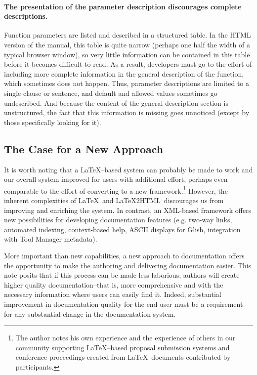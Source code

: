 \paragraph{The presentation of the parameter description discourages
complete descriptions.}  Function parameters are listed and described in a
structured table.  In the HTML version of the manual, this table is
quite narrow (perhaps one half the width of a typical browser
window), so very little information can be contained in this table
before it becomes difficult to read.  As a result, developers must go
to the effort of including more complete information in the general
description of the function, which sometimes does not happen.
Thus, parameter descriptions are limited to a single clause or
sentence, and default and allowed values sometimes go undescribed.
And because the content of the general description section is
unstructured, the fact that this information is missing goes unnoticed
(except by those specifically looking for it).  

\subsection{The Case for a New Approach} 

It is worth noting that a \LaTeX--based system can probably be made to
work and our overall system improved for users with additional effort,
perhaps even comparable to the effort of converting to a new
framework.\footnote{The author notes his own experience and the
experience of others in our community supporting \LaTeX--based
proposal submission systems and conference proceedings created from
\LaTeX\ documents contributed by participants.}  However, the inherent
complexities of \LaTeX\ and \LaTeX2HTML\ discourages us from improving
and enriching the system.  In contrast, an XML-based framework offers
new possibilities for developing documentation features
(e.g. two-way links, automated indexing, context-based help, ASCII
displays for Glish, integration with Tool Manager metadata).  

More important than new capabilities, a new approach to documentation
offers the opportunity to make the authoring and delivering
documentation easier.  This note posits that if this process can be
made less laborious, authors will create higher quality
documentation--that is, more comprehensive and with the necessary
information where users can easily find it.  Indeed, substantial
improvement in documentation quality for the end user must be a
requirement for any substantial change in the documentation system.  

